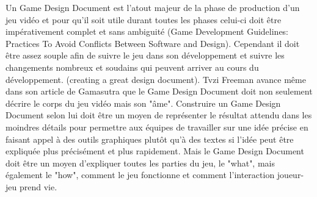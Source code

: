 Un Game Design Document est l'atout majeur de la phase de production d'un jeu vidéo et pour qu'il soit utile durant toutes les phases celui-ci doit être impérativement complet et sans ambiguité (Game Development Guidelines: Practices To Avoid Conflicts Between Software and Design). Cependant il doit être assez souple afin de suivre le jeu dans son développement et suivre les changements nombreux et soudains qui peuvent arriver au cours du développement. (creating a great design document). Tvzi Freeman avance même dans son article de Gamasutra que le Game Design Document doit non seulement décrire le corps du jeu vidéo mais son "âme". Construire un Game Design Document selon lui doit être un moyen de représenter le résultat attendu dans les moindres détails pour permettre aux équipes de travailler sur une idée précise en faisant appel à des outils graphiques plutôt qu'à des textes si l'idée peut être expliquée plus précisément et plus rapidement. Mais le Game Design Document doit être un moyen d'expliquer toutes les parties du jeu, le "what", mais également le "how", comment le jeu fonctionne et comment l'interaction joueur-jeu prend vie.